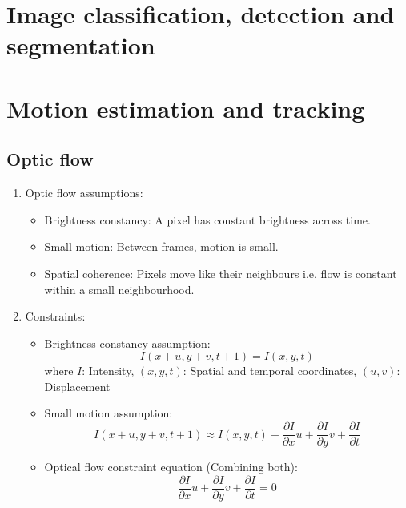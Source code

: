 \documentclass[9pt]{article}
\begin{document}
\begin{multicols}{2}
    \section{Image classification, detection and segmentation}

    \columnbreak

    \section{Motion estimation and tracking}
    \subsection{Optic flow}
    \begin{enumerate}
        \item Optic flow assumptions:
        \begin{itemize}
            \item Brightness constancy: A pixel has constant brightness across time.
            \item Small motion: Between frames, motion is small.
            \item Spatial coherence: Pixels move like their neighbours i.e. flow is constant within a small neighbourhood.
        \end{itemize}

        \item Constraints:
        \begin{itemize}
            \item Brightness constancy assumption: 
            $$
                I(x + u,y + v,t + 1) = I(x,y,t)
            $$
            where $I$: Intensity, $(x,y,t)$: Spatial and temporal coordinates, $(u,v)$: Displacement

            \item Small motion assumption:
            $$
                I(x+u,y+v,t+1) \approx I(x,y,t) + \frac{\partial I}{\partial x}u + \frac{\partial I}{\partial y}v + \frac{\partial I}{\partial t}
            $$

            \item Optical flow constraint equation (Combining both): 
            $$
                \frac{\partial I}{\partial x}u + \frac{\partial I}{\partial y}v + \frac{\partial I}{\partial t} = 0
            $$
        \end{itemize}
    \end{enumerate}
\end{multicols}
\end{document}
